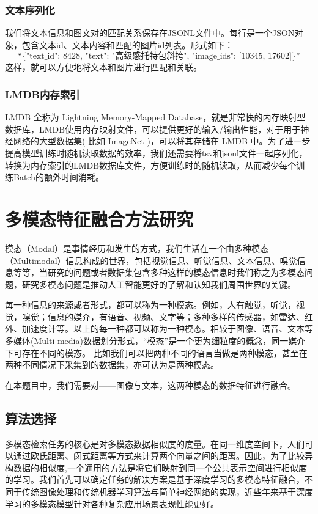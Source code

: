 \documentclass[a4paper]{zreport}
\begin{document}
\subsubsection{文本序列化}
我们将文本信息和图文对的匹配关系保存在JSONL文件中。每行是一个JSON对象，包含文本id、文本内容和匹配的图片id列表。形式如下：
$$\text{“\{"text\_id": 8428, "text": "高级感托特包斜挎", "image\_ids": [10345, 17602]\}”}$$
这样，就可以方便地将文本和图片进行匹配和关联。

\subsubsection{LMDB内存索引}
LMDB 全称为 Lightning Memory-Mapped Database，就是非常快的内存映射型数据库，LMDB使用内存映射文件，可以提供更好的输入/输出性能，对于用于神经网络的大型数据集( 比如 ImageNet )，可以将其存储在 LMDB 中。为了进一步提高模型训练时随机读取数据的效率，我们还需要将tsv和jsonl文件一起序列化，转换为内存索引的LMDB数据库文件，方便训练时的随机读取，从而减少每个训练Batch的额外时间消耗。

\section{多模态特征融合方法研究}

模态（Modal）是事情经历和发生的方式，我们生活在一个由多种模态（Multimodal）信息构成的世界，包括视觉信息、听觉信息、文本信息、嗅觉信息等等，当研究的问题或者数据集包含多种这样的模态信息时我们称之为多模态问题，研究多模态问题是推动人工智能更好的了解和认知我们周围世界的关键。

每一种信息的来源或者形式，都可以称为一种模态。例如，人有触觉，听觉，视觉，嗅觉；信息的媒介，有语音、视频、文字等；多种多样的传感器，如雷达、红外、加速度计等。以上的每一种都可以称为一种模态。相较于图像、语音、文本等多媒体(Multi-media)数据划分形式，“模态”是一个更为细粒度的概念，同一媒介下可存在不同的模态。 比如我们可以把两种不同的语言当做是两种模态，甚至在两种不同情况下采集到的数据集，亦可认为是两种模态。

在本题目中，我们需要对——图像与文本，这两种模态的数据特征进行融合。

\subsection{算法选择}

多模态检索任务的核心是对多模态数据相似度的度量。在同一维度空间下，人们可以通过欧氏距离、闵式距离等方式来计算两个向量之间的距离。因此，为了比较异构数据的相似度,一个通用的方法是将它们映射到同一个公共表示空间进行相似度的学习。我们首先可以确定任务的解决方案是基于深度学习的多模态特征融合，不同于传统图像处理和传统机器学习算法与简单神经网络的实现，近些年来基于深度学习的多模态模型针对各种复杂应用场景表现性能更好。
\end{document}
